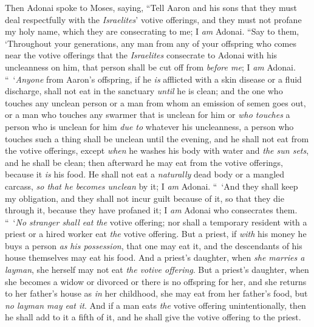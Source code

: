 \begin{biblechapter} %
 Then Adonai spoke to Moses, saying,
\verse “Tell Aaron and his sons that they must deal respectfully with the \textit{Israelites}’ votive offerings, and they must not profane my holy name, which they are consecrating to me; I \textit{am} Adonai.
\verse “Say to them, ‘Throughout your generations, any man from any of your offspring who comes near the votive offerings that the \textit{Israelites} consecrate to Adonai with his uncleanness on him, that person shall be cut off from \textit{before me}; I \textit{am} Adonai.
\verse “ ‘\textit{Anyone} from Aaron’s offspring, if he \textit{is} afflicted with a skin disease or a fluid discharge, shall not eat in the sanctuary \textit{until} he is clean; and the one who touches any unclean person or a man from whom an emission of semen goes out,
\verse or a man who touches any swarmer that is unclean for him or \textit{who touches} a person who is unclean for him \textit{due to} whatever his uncleanness,
\verse a person who touches such a thing shall be unclean until the evening, and he shall not eat from the votive offerings, except \textit{when} he washes his body with water
\verse and \textit{the sun sets}, and he shall be clean; then afterward he may eat from the votive offerings, because it \textit{is} his food.
\verse He shall not eat a \textit{naturally} dead body or a mangled carcass, \textit{so that he becomes unclean} by it; I \textit{am} Adonai.
\verse “ ‘And they shall keep my obligation, and they shall not incur guilt because of it, so that they die through it, because they have profaned it; I \textit{am} Adonai who consecrates them.
\verse “ ‘\textit{No stranger shall eat} \textit{the} votive offering; nor shall a temporary resident with a priest or a hired worker eat \textit{the} votive offering.
\verse But a priest, if \textit{with} his money he buys a person \textit{as} \textit{his possession}, that one may eat it, and the descendants of his house themselves may eat his food.
\verse And a priest’s daughter, when \textit{she marries a layman}, she herself may not eat \textit{the votive offering}.
\verse But a priest’s daughter, when she becomes a widow or divorced or there is no offspring for her, and she returns to her father’s house as \textit{in} her childhood, she may eat from her father’s food, but \textit{no layman may eat it}.
\verse And if a man eats \textit{the} votive offering unintentionally, then he shall add to it a fifth of it, and he shall give the votive offering to the priest.

\end{biblechapter}
